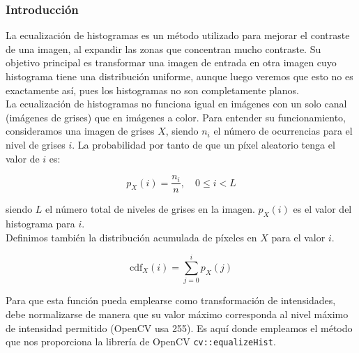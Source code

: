 \documentclass[11pt]{article}
\begin{document}
      \subsubsection{Introducción}

          \noindent
          La ecualización de histogramas es un método utilizado para mejorar el contraste de una imagen, al expandir las zonas que concentran mucho contraste. Su objetivo principal es transformar una imagen de entrada en otra imagen cuyo histograma tiene una distribución uniforme, aunque luego veremos que esto no es exactamente así, pues los histogramas no son completamente planos. \cite{opencv_histogram_equalization_tutorial} \\

          La ecualización de histogramas no funciona igual en imágenes con un solo canal
          (imágenes de grises) que en imágenes a color. Para entender su funcionamiento,
          consideramos una imagen de grises \( X \), siendo \( n_i \) el número de
          ocurrencias para el nivel de grises \( i \). La probabilidad por tanto de que
          un píxel aleatorio tenga el valor de \( i \) es:

          \[ p_X (i) = \frac{n_i}{n}, \quad 0 \leq i < L \]

          \noindent
          siendo \( L \) el número total de niveles de grises en la imagen. \( p_X (i)\) es el valor del histograma para \( i \). \\

          \noindent
          Definimos también la distribución acumulada de píxeles en \( X \) para el valor \( i \).

          \[ \text{cdf}_X(i) = \sum_{j=0}^{i} p_X(j) \]

          Para que esta función pueda emplearse como transformación de intensidades, debe
          normalizarse de manera que su valor máximo corresponda al nivel máximo de
          intensidad permitido (OpenCV usa 255). Es aquí donde empleamos el método que
          nos proporciona la librería de OpenCV \texttt{cv::equalizeHist}.
          \cite{opencv_equalizeHist_function}
\end{document}
